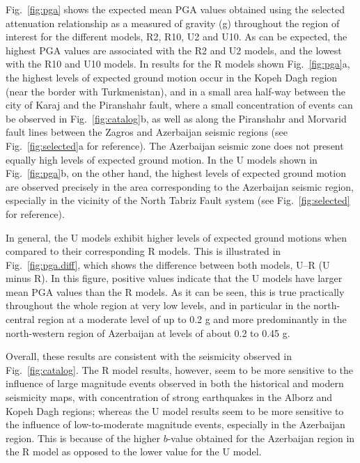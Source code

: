 Fig.~\ref{fig:pga} shows the expected mean PGA values obtained using the selected attenuation relationship as a measured of gravity (g) throughout the region of interest for the different models, R2, R10, U2 and U10. As can be expected, the highest PGA values are associated with the R2 and U2 models, and the lowest with the R10 and U10 models. In results for the R models shown Fig.~\ref{fig:pga}a, the highest levels of expected ground motion occur in the Kopeh Dagh region (near the border with Turkmenistan), and in a small area half-way between the city of Karaj and the Piranshahr fault, where a small concentration of events can be observed in Fig.~\ref{fig:catalog}b, as well as along the Piranshahr and Morvarid fault lines between the Zagros and Azerbaijan seismic regions (see Fig.~\ref{fig:selected}a for reference). The Azerbaijan seismic zone does not present equally high levels of expected ground motion. In the U models shown in Fig.~\ref{fig:pga}b, on the other hand, the highest levels of expected ground motion are observed precisely in the area corresponding to the Azerbaijan seismic region, especially in the vicinity of the North Tabriz Fault system (see Fig.~\ref{fig:selected} for reference).

In general, the U models exhibit higher levels of expected ground motions when compared to their corresponding R models. This is illustrated in Fig.~\ref{fig:pga.diff}, which shows the difference between both models, U--R (U minus R). In this figure, positive values indicate that the U models have larger mean PGA values than the R models. As it can be seen, this is true practically throughout the whole region at very low levels, and in particular in the north-central region at a moderate level of up to 0.2 g and more predominantly in the north-western region of Azerbaijan at levels of about 0.2 to 0.45 g.

Overall, these results are consistent with the seismicity observed in Fig.~\ref{fig:catalog}. The R model results, however, seem to be more sensitive to the influence of large magnitude events observed in both the historical and modern seismicity maps, with concentration of strong earthquakes in the Alborz and Kopeh Dagh regions; whereas the U model results seem to be more sensitive to the influence of low-to-moderate magnitude events, especially in the Azerbaijan region. This is because of the higher $b$-value obtained for the Azerbaijan region in the R model as opposed to the lower value for the U model.

